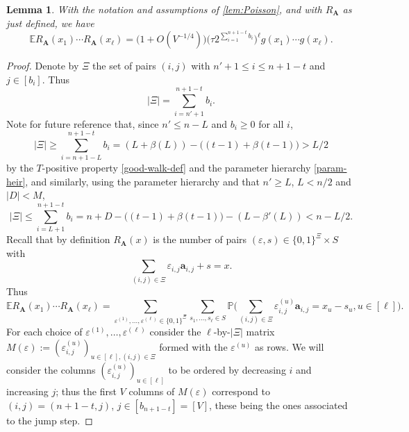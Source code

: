 \documentclass[11pt,reqno]{amsart}
\numberwithin{equation}{section}
\newtheorem{lemma}[theorem]{Lemma}
\theoremstyle{definition}
\theoremstyle{remark}
\newcommand{\mb}{\mathbb}
\newcommand{\mbf}{\mathbf}
\newcommand{\eps}{\varepsilon}
\renewcommand{\le}{\leqslant}
\renewcommand{\ge}{\geqslant}
\begin{document}
\begin{lemma}\label{lem:Poisson-weights} With the notation and assumptions of \cref{lem:Poisson}, and with $R_{\mbf{A}}$ as just defined, we have 
\begin{equation}\label{lem31-main-weighted} \mb{E} R_{\mbf{A}}(x_1) \cdots R_{\mbf{A}}(x_{\ell}) =\big(1 + O( V^{-1/4})\big) \Big( \tau 2^{\sum_{i =1}^{n + 1 - t} b_i}\Big)^{\ell} g(x_1) \cdots g(x_{\ell}).\end{equation}
\end{lemma}
\begin{proof}  Denote by $\Xi$ the set of pairs $(i,j)$ with $n'+1 \le i \le n + 1 - t$ and $j \in [b_i]$. Thus
\begin{equation}\label{xi-size} |\Xi| = \sum_{i = n'+1}^{n + 1 - t} b_i.\end{equation}
Note for future reference that, since $n' \le n - L$ and $b_i \ge 0$ for all $i$, 
\begin{equation}\label{xi-fr} |\Xi| \ge \sum_{i = n+1-L}^{n + 1 - t}b_i = (L + \beta(L)) - \big((t-1) +  \beta(t-1)\big) > L/2\end{equation} by the $T$-positive property \cref{good-walk-def} and the parameter hierarchy \cref{param-heir}, and similarly, using the parameter hierarchy and that $n' \ge L$, $L < n/2$ and $|D| < M$,
\begin{equation}\label{xi-upper-mat} |\Xi| \le \sum_{i = L+1}^{n + 1 - t} b_i = n + D - \big((t - 1) + \beta(t - 1)\big) - (L - \beta'(L)) < n - L/2.\end{equation}
Recall that by definition $R_{\mbf{A}}(x)$ is the number of pairs $(\eps, s) \in \{0,1\}^{\Xi} \times S$ with 
\[ \sum_{(i,j) \in \Xi} \eps_{i,j} \mbf{a}_{i,j} + s = x.\] Thus 
\begin{equation}\label{counting-cor} \mb{E} R_{\mbf{A}}(x_1) \cdots R_{\mbf{A}}(x_{\ell}) = \sum_{\eps^{(1)}, \dots, \eps^{(\ell)} \in \{0,1\}^{\Xi}}\sum_{s_1,\dots, s_{\ell} \in S} \mb{P}\Big(\sum_{(i,j) \in \Xi} \eps^{(u)}_{i,j} \mbf{a}_{i,j} = x_u - s_u, u \in  [\ell]\Big).\end{equation}
For each choice of $\eps^{(1)},\dots, \eps^{(\ell)}$ consider the $\ell$-by-$|\Xi|$ matrix $M(\eps) := (\eps^{(u)}_{i,j})_{u \in [\ell], (i,j) \in \Xi}$ formed with the $\eps^{(u)}$ as rows. We will consider the columns $(\eps_{i,j}^{(u)})_{u \in [\ell]}$ to be ordered by decreasing $i$ and increasing $j$; thus the first $V$ columns of $M(\eps)$ correspond to $(i,j) = (n + 1 - t, j)$, $j \in [b_{n+1 - t}] = [V]$, these being the ones associated to the jump step.


\end{proof}
\end{document}
